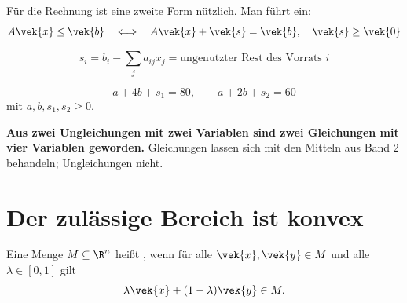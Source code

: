 \begin{merksatz}
Für die Rechnung ist eine zweite Form nützlich. Man führt  ein:
\[ A\vek{x} \le \vek{b} \quad\Longleftrightarrow\quad A\vek{x} + \vek{s} = \vek{b}, \quad \vek{s} \ge \vek{0} \]

\[ s_i = b_i - \sum_j a_{ij}x_j = \text{ungenutzter Rest des Vorrats } i \]

\[ a + 4b + s_1 = 80, \qquad a + 2b + s_2 = 60 \]
mit $a, b, s_1, s_2 \ge 0$.

\begin{center}
\begin{minipage}{0.9\textwidth}
\textbf{Aus zwei Ungleichungen mit zwei Variablen sind zwei Gleichungen mit vier Variablen geworden.} Gleichungen lassen sich mit den Mitteln aus Band 2 behandeln; Ungleichungen nicht.
\end{minipage}
\end{center}

\begin{center}
\begin{minipage}{0.88\textwidth}
\end{minipage}
\end{center}
\end{merksatz}

\section{Der zulässige Bereich ist konvex}

\begin{definition}
Eine Menge $M \subseteq \R^n$ heißt , wenn für alle $\vek{x},\vek{y} \in M$ und alle $\lambda \in [0,1]$ gilt
\[ \lambda\vek{x} + (1-\lambda)\vek{y} \in M . \]
\end{definition}


